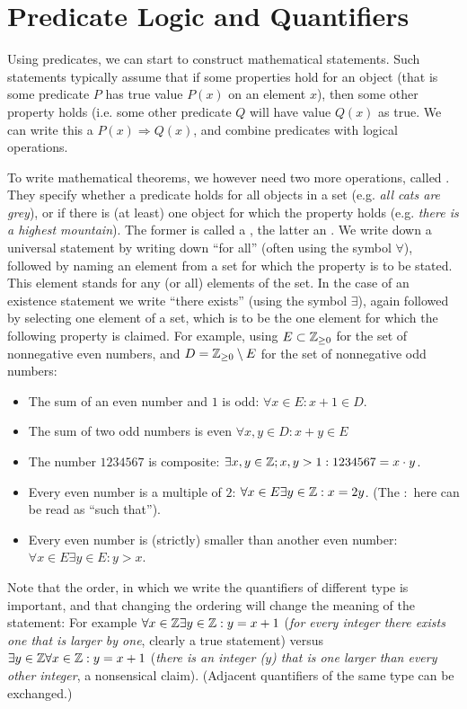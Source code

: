 \section{Predicate Logic and Quantifiers}

Using predicates, we can start to construct mathematical statements. Such
statements typically assume that if some properties hold for an object (that
is some predicate $P$ has true value $P(x)$ on an element $x$), then some
other property holds (i.e. some other predicate $Q$ will have value $Q(x)$
as true. We can write this a $P(x)\Rightarrow Q(x)$, and combine predicates
with logical operations.

To write mathematical theorems, we however need two more operations, called
. They specify whether a predicate holds for all objects
in a set (e.g. {\em all cats are grey}), or if there is (at least) one
object for which the property holds (e.g. {\em there is a highest
mountain}). The former is called a , the latter
an .
We write down a universal statement
by writing down ``for all'' (often using the symbol $\forall$), followed by
naming an element from a set for which the property is to be stated. This
element stands for any (or all) elements of the set.
In the case of an existence statement we write ``there exists'' (using the
symbol $\exists$), again followed by selecting one element of a set, which
is to be the one element for which the following property is claimed.
For example,
using $E\subset{\mathbb Z}_{\ge 0}$ for the set of nonnegative even numbers, and
$D={\mathbb Z}_{\ge 0}\setminus E$ for the
set of nonnegative odd numbers:
\begin{itemize}
\item The sum of an even number and $1$ is odd: 
$\forall x\in E: x+1\in D$.
\item The sum of two odd numbers is even
$\forall x,y\in D:x+y\in E$
\item
The number $1234567$ is composite: $\exists x,y\in{\mathbb Z}; x,y>1: 1234567=x\cdot
y$.
\item
Every even number is a multiple of $2$: $\forall x\in E\exists y\in{\mathbb Z}:
x=2y$. (The $:$ here can be read as ``such that'').
\item 
Every even number is (strictly) smaller than another even number:
$\forall x\in E\exists y\in E:y>x$.
\end{itemize}

Note that the order, in which we write the quantifiers of different type is important, and
that changing the ordering will change the meaning of the statement: For
example $\forall x\in{\mathbb Z}\exists y\in {\mathbb Z}: y=x+1$ ({\em for every integer there
exists one that is larger by one}, clearly a true statement) versus $\exists
y\in {\mathbb Z}\forall x\in{\mathbb Z}: y=x+1$ ({\em there is an integer ($y$) that is one
larger than every other integer}, a nonsensical claim).
(Adjacent quantifiers of the same type can be exchanged.)
\medskip


